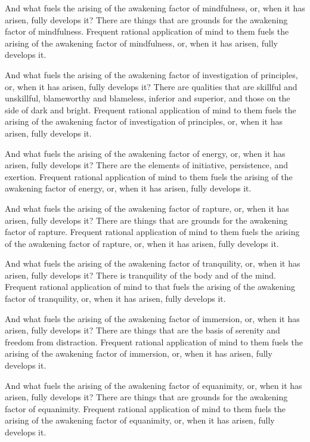 \documentclass[12pt,openany]{book}%
\begin{document}
And what fuels the arising of the awakening factor of mindfulness, or, when it has arisen, fully develops it? There are things that are grounds for the awakening factor of mindfulness. Frequent rational application of mind to them fuels the arising of the awakening factor of mindfulness, or, when it has arisen, fully develops it. 

And what fuels the arising of the awakening factor of investigation of principles, or, when it has arisen, fully develops it? There are qualities that are skillful and unskillful, blameworthy and blameless, inferior and superior, and those on the side of dark and bright. Frequent rational application of mind to them fuels the arising of the awakening factor of investigation of principles, or, when it has arisen, fully develops it. 

And what fuels the arising of the awakening factor of energy, or, when it has arisen, fully develops it? There are the elements of initiative, persistence, and exertion. Frequent rational application of mind to them fuels the arising of the awakening factor of energy, or, when it has arisen, fully develops it. 

And what fuels the arising of the awakening factor of rapture, or, when it has arisen, fully develops it? There are things that are grounds for the awakening factor of rapture. Frequent rational application of mind to them fuels the arising of the awakening factor of rapture, or, when it has arisen, fully develops it. 

And what fuels the arising of the awakening factor of tranquility, or, when it has arisen, fully develops it? There is tranquility of the body and of the mind. Frequent rational application of mind to that fuels the arising of the awakening factor of tranquility, or, when it has arisen, fully develops it. 

And what fuels the arising of the awakening factor of immersion, or, when it has arisen, fully develops it? There are things that are the basis of serenity and freedom from distraction. Frequent rational application of mind to them fuels the arising of the awakening factor of immersion, or, when it has arisen, fully develops it. 

And what fuels the arising of the awakening factor of equanimity, or, when it has arisen, fully develops it? There are things that are grounds for the awakening factor of equanimity. Frequent rational application of mind to them fuels the arising of the awakening factor of equanimity, or, when it has arisen, fully develops it. 
\end{document}
